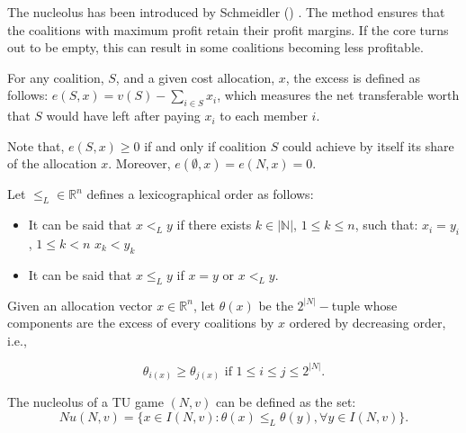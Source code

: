 The nucleolus has been introduced by Schmeidler (\cite{Schmeidler}) . The method ensures that the
coalitions with maximum profit retain their profit margins. If the core turns out to be empty,
this can result in some coalitions becoming less profitable.

\begin{definition}	
	For any coalition, $S$, and a given cost allocation, $x$, the excess is defined as follows:
	$e(S,x)=v(S) - \sum_{i \in S}x_{i}$,
	which measures the net transferable worth that $S$ would have left after paying $x_{i}$ to each member $i$.
	
\end{definition}
Note that, $e(S,x) \geq 0$ if and only if coalition $S$ could achieve by itself its share of the allocation $x$. Moreover, $e(\emptyset,x)=e(N,x)=0$.
\begin{definition}
	Let $\leq_{L} \in \mathbb{R}^n$ defines a lexicographical order as follows:
	\begin{itemize}
		\item It can be said that $x <_{L} y$ if there exists $k \in \mathbb{|N|}$, $1 \leq k \leq n$, such that:
		$x_{i} = y_{i}$, $1 \leq k < n$
		$x_k<y_k$
		\item It can be said that $x \leq_{L} y$ if $x=y$ or $x <_{L} y$.
	\end{itemize}
	
	
	Given an allocation vector $x \in \mathbb{R}^n$, let $\theta(x)$ be the $2^{|N|}-$tuple whose components are the excess of every coalitions by $x$ ordered by decreasing order, i.e.,
	
	$$\theta_{i(x)} \geq \theta_{j(x)} \text{ if } 1\leq i \leq j \leq 2^{|N|}.$$
\end{definition}

\begin{definition}
	The nucleolus of a TU game $(N,v)$ can be defined as the set:
	$$Nu(N,v) = \{x \in I(N,v) : \theta(x) \leq_{L} \theta (y), \forall y \in I(N,v) \}.$$
\end{definition}


